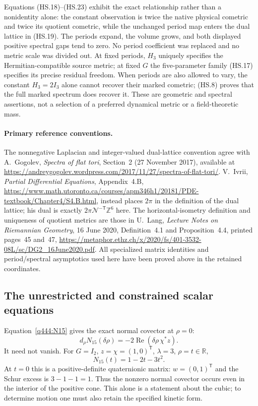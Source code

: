 Equations (HS.18)--(HS.23) exhibit the exact relationship rather than
a nonidentity alone: the constant observation is twice the native
physical cometric and twice its quotient cometric, while the unchanged
period map enters the dual lattice in (HS.19). The periods expand,
the volume grows, and both displayed positive spectral gaps tend to
zero. No period coefficient was replaced and no metric scale was
divided out. At fixed periods, $H_3$ uniquely specifies the
Hermitian-compatible source metric; at fixed $G$ the five-parameter
family (HS.17) specifies its precise residual freedom. When periods
are also allowed to vary, the constant $H_3=2I_3$ alone cannot recover
their marked cometric; (HS.8) proves that the full marked spectrum
does recover it. These are geometric and spectral assertions, not
a selection of a preferred dynamical metric or a field-theoretic mass.

\paragraph{Primary reference conventions.}
The nonnegative Laplacian and integer-valued dual-lattice convention
agree with A.~Gogolev, \emph{Spectra of flat tori}, Section~2
(27 November 2017), available at
\url{https://andreygogolev.wordpress.com/2017/11/27/spectra-of-flat-tori/}.
V.~Ivrii, \emph{Partial Differential Equations}, Appendix~4.B,
\url{https://www.math.utoronto.ca/courses/apm346h1/20181/PDE-textbook/Chapter4/S4.B.html},
instead places $2\pi$ in the definition of the dual lattice;
his dual is exactly $2\pi\mathcal N^{-\mathsf T}\mathbb Z^6$ here.
The horizontal-isometry definition and uniqueness of quotient metrics
are those in U.~Lang, \emph{Lecture Notes on Riemannian Geometry},
16 June 2020, Definition~4.1 and Proposition~4.4, printed pages~45
and~47,
\url{https://metaphor.ethz.ch/x/2020/fs/401-3532-08L/sc/DG2_16June2020.pdf}.
All specialized matrix identities and period/spectral asymptotics
used here have been proved above in the retained coordinates.

\subsection{The unrestricted and constrained scalar equations}

Equation~\eqref{q444:N15} gives the exact normal covector at $\rho=0$:
\begin{equation}\label{q444:normal-covector}
 d_{\rho}N_{15}(\delta\rho)
 =-2\operatorname{Re}(\delta\rho\,\chi^*z).
\end{equation}
It need not vanish. For $G=I_2$, $z=\chi=(1,0)^{\mathsf T}$,
$\lambda=3$, $\rho=t\in\mathbb R$,
\[
 N_{15}(t)=1-2t-3t^2.
\]
At $t=0$ this is a positive-definite quaternionic matrix:
$w=(0,1)^{\mathsf T}$ and the Schur excess is $3-1-1=1$.
Thus the nonzero normal covector occurs even in the interior of the
positive cone. This alone is a statement about the cubic; to determine
motion one must also retain the specified kinetic form.

